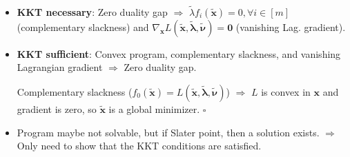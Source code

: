 \documentclass[8pt,a4paper]{extarticle}
\renewcommand{\proof}[1]{\begin{tcolorbox}#1 \hfill $\square$\end{tcolorbox}}
\renewcommand{\vec}[1]{\bm{#1}}
\newenvironment{topic}[1]
{\textbf{\sffamily \colorbox{black}{\rlap{\textbf{\textcolor{white}{#1}}}\hspace{\linewidth}\hspace{-2\fboxsep}}} \\ \vspace{0.2cm}}
{}
\begin{document}
\begin{multicols*}{2}
\begin{topic}{Non-linear programming}
\begin{itemize}
            \item \textbf{KKT necessary}: Zero duality gap $\Rightarrow$ $\tilde{\lambda} f_i(\tilde{\vec{x}}) = 0, \forall i \in [m]$ (complementary slackness) and $\nabla_{\vec{x}} L(\tilde{\vec{x}}, \tilde{\vec{\lambda}}, \tilde{\vec{\nu}}) = \vec{0}$ (vanishing Lag. gradient).
            \item \textbf{KKT sufficient}: Convex program, complementary slackness, and vanishing Lagrangian gradient $\Rightarrow$ Zero duality gap.
                  \proof{Complementary slackness ($f_0(\tilde{\vec{x}}) = L(\tilde{\vec{x}},
                          \tilde{\vec{\lambda}}, \tilde{\vec{\nu}})$) $\Rightarrow$ $L$ is convex in $\vec{x}$
                      and gradient is zero, so $\tilde{\vec{x}}$ is a global minimizer.}
            \item Program maybe not solvable, but if Slater point, then a solution exists. $\Rightarrow$ Only need to
                  show that the KKT conditions are satisfied.
        \end{itemize}
    \end{topic}


\end{multicols*}
\end{document}
